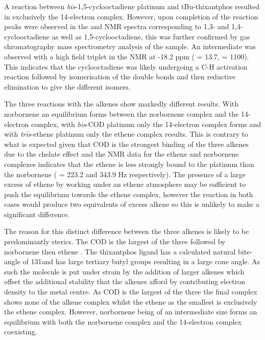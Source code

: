 A reaction between \emph{bis}-1,5-cyclooctadiene platinum and tBu-thixantphos resulted in exclusively the 14-electron complex.  However, upon completion of the reaction peaks were observed in the \proton{} and \carbon{} NMR spectra corresponding to 1,3- and 1,4-cyclooctadiene as well as 1,5-cyclooctadiene, this was further confirmed by gas chromatography mass spectrometry analysis of the sample.  An intermediate was observed with a high field triplet in the \proton{} NMR at -18.2 ppm (\JPH{} = 13.7, \JPtH = 1100).  This indicates that the cyclooctadiene was likely undergoing a C-H activation reaction followed by isomerisation of the double bonds and then reductive elimination to give the different isomers.  

The three reactions with the alkenes show markedly different results.  With norbornene an equilibrium forms between the norbornene complex and the 14-electron complex, with \emph{bis}-COD platinum only the 14-electron complex forms and with \emph{tris}-ethene platinum only the ethene complex results.  This is contrary to what is expected given that COD is the strongest binding of the three alkenes due to the chelate effect and the NMR data for the ethene and norbornene complexes indicates that the ethene is less strongly bound to the platinum than the norbornene (\JPtC{} = 223.2 and 343.9 Hz respectively).  The presence of a large excess of ethene by working under an ethene atmosphere may be sufficient to push the equilibrium towards the ethene complex, however the reaction in both cases would produce two equivalents of excess alkene so this is unlikely to make a significant difference.  

The reason for this distinct difference between the three alkenes is likely to be predominantly sterics.  The COD is the largest of the three followed by norbornene then ethene .  The thixantphos ligand has a calculated natural bite-angle of 131\degrees and has large tertiary butyl groups resulting in a large cone angle.  As such the molecule is put under strain by the addition of larger alkenes which offset the additional stability that the alkenes afford by contributing electron density to the metal centre.  As COD is the largest of the three the final complex shows none of the alkene complex whilst the ethene as the smallest is exclusively the ethene complex.  However, norbornene being of an intermediate size forms an equilibrium with both the norbornene complex and the 14-electron complex coexisting.  

